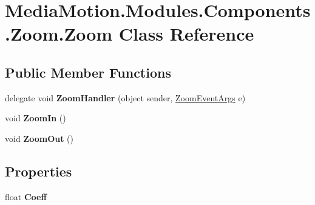 \hypertarget{class_media_motion_1_1_modules_1_1_components_1_1_zoom_1_1_zoom}{\section{Media\+Motion.\+Modules.\+Components.\+Zoom.\+Zoom Class Reference}
\label{class_media_motion_1_1_modules_1_1_components_1_1_zoom_1_1_zoom}
}
\subsection*{Public Member Functions}
\begin{DoxyCompactItemize}
\item 
\hypertarget{class_media_motion_1_1_modules_1_1_components_1_1_zoom_1_1_zoom_a8852d656a38cf63f2a925081331d776a}{delegate void {\bfseries Zoom\+Handler} (object sender, \hyperlink{class_media_motion_1_1_modules_1_1_components_1_1_zoom_1_1_events_1_1_zoom_event_args}{Zoom\+Event\+Args} e)}\label{class_media_motion_1_1_modules_1_1_components_1_1_zoom_1_1_zoom_a8852d656a38cf63f2a925081331d776a}

\item 
\hypertarget{class_media_motion_1_1_modules_1_1_components_1_1_zoom_1_1_zoom_a18f758cb3e09c6d7b5e185e5ae3567f6}{void {\bfseries Zoom\+In} ()}\label{class_media_motion_1_1_modules_1_1_components_1_1_zoom_1_1_zoom_a18f758cb3e09c6d7b5e185e5ae3567f6}

\item 
\hypertarget{class_media_motion_1_1_modules_1_1_components_1_1_zoom_1_1_zoom_ad1ef765101ff933dedcfb27a37fc2b3e}{void {\bfseries Zoom\+Out} ()}\label{class_media_motion_1_1_modules_1_1_components_1_1_zoom_1_1_zoom_ad1ef765101ff933dedcfb27a37fc2b3e}

\end{DoxyCompactItemize}
\subsection*{Properties}
\begin{DoxyCompactItemize}
\item 
\hypertarget{class_media_motion_1_1_modules_1_1_components_1_1_zoom_1_1_zoom_a0367d9e6cfc175cf7da89eac7e9bafb0}{float {\bfseries Coeff}}\label{class_media_motion_1_1_modules_1_1_components_1_1_zoom_1_1_zoom_a0367d9e6cfc175cf7da89eac7e9bafb0}

\end{DoxyCompactItemize}
